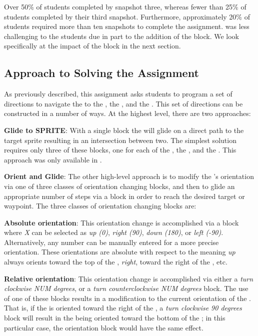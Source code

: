 Over 50\% of \stwo{} students completed by snapshot three, whereas fewer than
25\% of \sone{} students completed by their third snapshot. Furthermore,
approximately 20\% of \sone{} \com{} students required more than ten snapshots
to complete the assignment. \stwo{} was less challenging to the students due in
part to the addition of the \glideto{} block. We look specifically at the
impact of the \glideto{} block in the next section.

\subsection{Approach to Solving the Assignment}
As previously described, this assignment asks students to program a set of
directions to navigate the \net{} to \catch{} the \bear{}, the \horse{},
and the \zebra{}. This set of directions can be constructed in a number of
ways. At the highest level, there are two approaches:

\textbf{Glide to SPRITE}: With a single \glideto{} block the \net{} will glide
on a direct path to the target sprite resulting in an intersection between
two. The simplest \com{} solution requires only three of these blocks, one for
each of the \bear{}, the \horse{}, and the \zebra{}. This approach was only
available in \stwo{}.

\textbf{Orient and Glide}: The other high-level approach is to modify the
\net{}'s orientation via one of three classes of orientation changing blocks,
and then to glide an appropriate number of steps via a \glideDIST{} block in
order to reach the desired target or waypoint. The three classes of orientation
changing blocks are:

\textbf{Absolute orientation}: This orientation change is accomplished via a
\pointDIR{} block where \emph{X} can be selected as \emph{up (0)}, \emph{right
  (90)}, \emph{down (180)}, or \emph{left (-90)}. Alternatively, any number can
be manually entered for a more precise orientation. These orientations are
absolute with respect to the \stage{} meaning \emph{up} always orients toward
the top of the \stage{}, \emph{right}, toward the right of the \stage{}, etc.

\textbf{Relative orientation}: This orientation change is accomplished via
either a \emph{turn clockwise NUM degrees}, or a \emph{turn counterclockwise
  NUM degrees} block. The use of one of these blocks results in a modification
to the current orientation of the \net{}. That is, if the \net{} is oriented
toward the right of the \stage{}, a \emph{turn clockwise 90 degrees} block will
result in the \net{} being oriented toward the bottom of the \stage{}; in this
particular case, the \abs{} orientation block \pointDIR[down]{} would have the
same effect.

